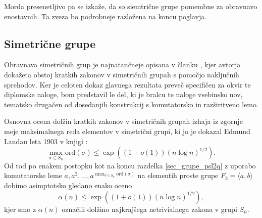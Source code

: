  Morda presenetljivo pa se izkaže, da so siemtrične grupe pomembne za obravnavo enostavnih. Ta zveza bo podrobneje razložena na koncu poglavja. 

\subsection{Simetrične grupe}\label{sec_simetricne_grupe}


Obravnava simetričnih grup je najnatančneje opisana v članku \cite{Kozma_Thom_2016}, kjer avtorja dokažeta obstoj kratkih zakonov v simetričnih grupah s pomočjo naključnih sprehodov.
Ker je celoten dokaz glavnega rezultata preveč specifičen za okvir te diplomske naloge, bom predstavil le del, ki je bralcu te naloge vsebinsko nov, tematsko drugačen od dosedanjih konstrukcij s komutatorsko in razširitveno lemo.

Osnovna ocena dolžin kratkih zakonov v simetričnih grupah izhaja iz zgornje meje maksimalnega reda elementov v simetrični grupi,
ki jo je dokazal Edmund Landau leta 1903 v knjigi \cite{Landau_1903}: \begin{equation*}
\max_{\sigma \in S_n} \text{ord}(\sigma) \le \exp((1 + o(1)) (n \log n)^{1 / 2}).
\end{equation*}  
Od tod po enakem postopku kot na koncu razdelka \ref{sec_grupe_psl2q} z uporabo komutatorske leme $a, a^2, \ldots, a^{\max_{\sigma \in S_n} \text{ord}(\sigma)}$ na elementih proste grupe $F_2 = \langle a, b \rangle$ dobimo asimptotsko gledano enako oceno \begin{equation*}
    \alpha(n)  \le \exp((1 + o(1)) (n \log n)^{1 / 2}),
\end{equation*}  
kjer smo z $\alpha(n)$ označili dolžino najkrajšega netrivialnega zakona v grupi $S_n$.

